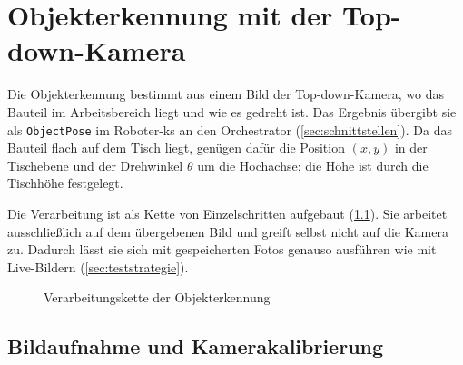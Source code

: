 \chapter{Objekterkennung mit der Top-down-Kamera}
\label{ch:objekterkennung}

Die Objekterkennung bestimmt aus einem Bild der Top-down-Kamera, wo das Bauteil im
Arbeitsbereich liegt und wie es gedreht ist. Das Ergebnis übergibt sie als
\texttt{ObjectPose} im Roboter-\ac{ks} an den Orchestrator (\cref{sec:schnittstellen}). Da
das Bauteil flach auf dem Tisch liegt, genügen dafür die Position $(x, y)$ in der Tischebene
und der Drehwinkel $\theta$ um die Hochachse; die Höhe ist durch die Tischhöhe festgelegt.

Die Verarbeitung ist als Kette von Einzelschritten aufgebaut (\cref{fig:m1-kette}). Sie
arbeitet ausschließlich auf dem übergebenen Bild und greift selbst nicht auf die Kamera zu.
Dadurch lässt sie sich mit gespeicherten Fotos genauso ausführen wie mit Live-Bildern
(\cref{sec:teststrategie}).

\begin{figure}[htbp]
  \centering
  \caption{Verarbeitungskette der Objekterkennung}
  \label{fig:m1-kette}
\end{figure}

\section{Bildaufnahme und Kamerakalibrierung}
\label{sec:m1-kalibrierung}

